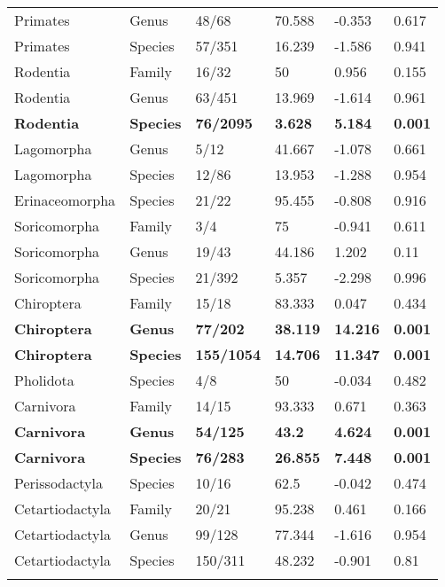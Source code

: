 \begin{longtable}{llllll}
  Primates & Genus & 48/68 & 70.588 & -0.353 & 0.617 \\ 
  Primates & Species & 57/351 & 16.239 & -1.586 & 0.941 \\ 
  Rodentia & Family & 16/32 & 50 & 0.956 & 0.155 \\ 
  Rodentia & Genus & 63/451 & 13.969 & -1.614 & 0.961 \\ 
  \textbf{Rodentia} & \textbf{Species} & \textbf{76/2095} & \textbf{3.628} & \textbf{5.184} & \textbf{0.001} \\ 
  Lagomorpha & Genus & 5/12 & 41.667 & -1.078 & 0.661 \\ 
  Lagomorpha & Species & 12/86 & 13.953 & -1.288 & 0.954 \\ 
  Erinaceomorpha & Species & 21/22 & 95.455 & -0.808 & 0.916 \\ 
  Soricomorpha & Family & 3/4 & 75 & -0.941 & 0.611 \\ 
  Soricomorpha & Genus & 19/43 & 44.186 & 1.202 & 0.11 \\ 
  Soricomorpha & Species & 21/392 & 5.357 & -2.298 & 0.996 \\ 
  Chiroptera & Family & 15/18 & 83.333 & 0.047 & 0.434 \\ 
  \textbf{Chiroptera} & \textbf{Genus} & \textbf{77/202} & \textbf{38.119} & \textbf{14.216} & \textbf{0.001} \\ 
  \textbf{Chiroptera} & \textbf{Species} & \textbf{155/1054} & \textbf{14.706} & \textbf{11.347} & \textbf{0.001} \\ 
  Pholidota & Species & 4/8 & 50 & -0.034 & 0.482 \\ 
  Carnivora & Family & 14/15 & 93.333 & 0.671 & 0.363 \\ 
  \textbf{Carnivora} & \textbf{Genus} & \textbf{54/125} & \textbf{43.2} & \textbf{4.624} & \textbf{0.001} \\ 
  \textbf{Carnivora} & \textbf{Species} & \textbf{76/283} & \textbf{26.855} & \textbf{7.448} & \textbf{0.001} \\ 
  Perissodactyla & Species & 10/16 & 62.5 & -0.042 & 0.474 \\ 
  Cetartiodactyla & Family & 20/21 & 95.238 & 0.461 & 0.166 \\ 
  Cetartiodactyla & Genus & 99/128 & 77.344 & -1.616 & 0.954 \\ 
  Cetartiodactyla & Species & 150/311 & 48.232 & -0.901 & 0.81 \\ 
   \hline
\hline
\label{Table_data_structure}
\end{longtable}
